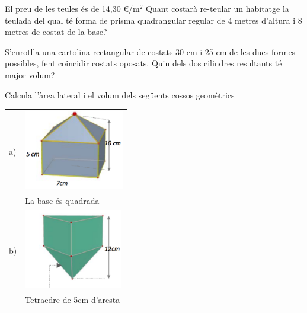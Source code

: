 \begin{activitats}
\begin{mylist}

\exer  El preu de les teules és de 14,30 \euro{}/m${}^{2}$ Quant costarà re-teular un habitatge la teulada del qual té forma de prisma quadrangular regular de 4 metres d'altura i 8 metres de costat de la base?


\exer  S'enrotlla una cartolina rectangular de costats 30 cm i 25 cm de les dues formes possibles, fent coincidir costats oposats. Quin dels dos cilindres resultants té major volum?


\exer  Calcula l'àrea lateral i el volum dels següents cossos geomètrics

\begin{center}
	\scriptsize
	
	\begin{tabular}{p{1cm}p{4cm}}
		
		a) & \includegraphics[height=3.5cm]{img-11/88a} \\ & La base és quadrada  \\
		
		b) & \includegraphics[height=3.5cm]{img-11/88b} \\ &  Tetraedre de 5cm d'aresta \\
	\end{tabular}
\end{center}		
	
\begin{center}
	\scriptsize	
		\begin{tabular}{p{1cm}p{4cm}}	
		

\end{tabular}
\end{center}
\end{mylist}
\end{activitats}
